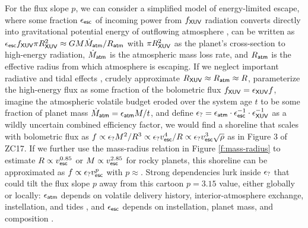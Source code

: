 \documentclass[modern,linenumbers,trackchanges]{aastex7}
\begin{document}
For the flux slope $p$, we can consider a simplified model of energy-limited escape, where some fraction $\epsilon_{\sf esc}$ of incoming power from $f_{\sf XUV}$ radiation converts directly into gravitational potential energy of outflowing atmosphere \citep{watsonDynamicsRapidlyEscaping1981}, can be written as $\epsilon_{\sf esc} f_{\sf XUV} \pi R_{\sf XUV}^2 \approx GM \dot{M}_{\sf atm}/R_{\sf atm}$ with $\pi R_{\sf XUV}^2$ as the planet's cross-section to high-energy radiation, $\dot{M}_{\sf atm}$ is the atmospheric mass loss rate, and $R_{\sf atm}$ is the effective radius from which atmosphere is escaping. If we neglect important radiative and tidal effects \citep[see][]{lammerAtmosphericLossExoplanets2003, erkaevRocheLobeEffects2007}, crudely approximate $R_{\sf XUV} \approx R_{\sf atm} \approx R$, parameterize the high-energy flux as some fraction of the bolometric flux $f_{\sf XUV} = \epsilon_{\sf XUV} f$,  imagine the atmospheric volatile budget eroded over the system age $t$ to be some fraction of planet mass $\dot{M}_{\sf atm} = \epsilon_{\sf atm} M/t$, and define $\epsilon_{\sf ?} = \epsilon_{\sf atm} \cdot \epsilon_{\sf esc}^{-1} \cdot \epsilon_{\sf XUV}^{-1}$ as a wildly uncertain combined efficiency factor, we would find a shoreline that scales with bolometric flux as $f \propto \epsilon_{\sf ?}  M^2/R^3  \propto \epsilon_{\sf ?}  v_{\sf esc}^4/R  \propto \epsilon_{\sf ?}  v_{\sf esc}^3\sqrt{\rho}$ as in Figure 3 of ZC17. If we further use the mass-radius relation in Figure \ref{f:mass-radius} to estimate $R\propto v_{\sf esc}^{0.85}$ or $M \propto v_{\sf esc}^{2.85}$ for rocky planets, this shoreline can be approximated as $f \propto  \epsilon_{\sf ?}  v_{\sf esc}^p$ with $p \approx$. Strong dependencies lurk inside $\epsilon_{\sf ?}$ that could tilt the flux slope $p$ away from this cartoon $p=3.15$ value, either globally or locally: $\epsilon_{\sf atm}$ depends on volatile delivery history, interior-atmosphere exchange, instellation, and tides \citep{elkins-tantonRangesAtmosphericMass2008, schaeferPredictionsAtmosphericComposition2016c, kiteAtmosphereinteriorExchangeHot2016, seligmanPotentialMeltingExtrasolar2024}, and $\epsilon_{\sf esc}$ depends on instellation, planet mass, and composition \citep{murray-clayAtmosphericEscapeHot2009, owenPlanetaryEvaporationUV2012, owenEvaporationValleyKepler2017, chatterjeeNovelPhysicsEscaping2024, jiCosmicShorelineRevisited2025, leeCarvingEdgesRocky2025}.
\end{document}
